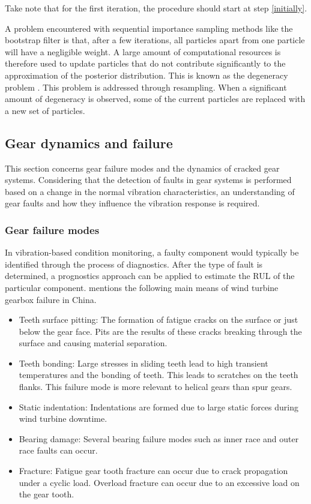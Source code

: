 Take note that for the first iteration, the procedure should start at step \ref{initially}.

A problem encountered with sequential importance sampling methods like the bootstrap filter is that, after a few iterations, all particles apart from one particle will have a negligible weight. A large amount of computational resources is therefore used to update particles that do not contribute significantly to the approximation of the posterior distribution. This is known as the degeneracy problem \citep{Arulampalam2002}. This problem is addressed through resampling. When a significant amount of degeneracy is observed, some of the current particles are replaced with a new set of particles. 

\subsection{Gear dynamics and failure}
This section concerns gear failure modes and the dynamics of cracked gear systems. Considering that the detection of faults in gear systems is performed based on a change in the normal vibration characteristics, an understanding of gear faults and how they influence the vibration response is required.



\subsubsection{Gear failure modes}

In vibration-based condition monitoring, a faulty component would typically be identified through the process of diagnostics. After the type of fault is determined, a prognostics approach can be applied to estimate the RUL of the particular component. \cite{Lin2016} mentions the following main means of wind turbine gearbox failure in China.

\begin{itemize}
	\item Teeth surface pitting: The formation of fatigue cracks on the surface or just below the gear face. Pits are the results of these cracks breaking through the surface and causing material separation.
	\item Teeth bonding: Large stresses in sliding teeth lead to high transient temperatures and the bonding of teeth. This leads to scratches on the teeth flanks. This failure mode is more relevant to helical gears than spur gears. 
	\item Static indentation:  Indentations are formed due to large static forces during wind turbine downtime.
	\item Bearing damage: Several bearing failure modes such as inner race and outer race faults can occur. 
	\item Fracture: Fatigue gear tooth fracture can occur due to crack propagation under a cyclic load. Overload fracture can occur due to an excessive load on the gear tooth.
\end{itemize}

